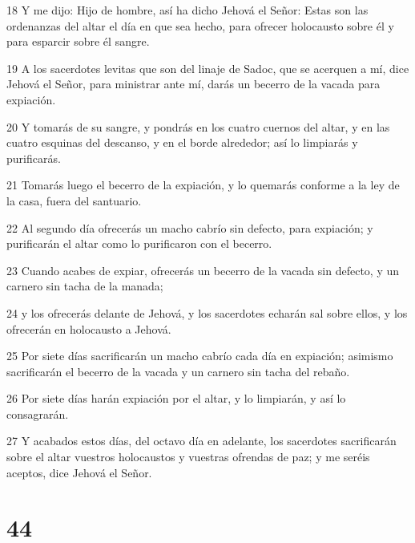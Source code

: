 \par 18 Y me dijo: Hijo de hombre, así ha dicho Jehová el Señor: Estas son las ordenanzas del altar el día en que sea hecho, para ofrecer holocausto sobre él y para esparcir sobre él sangre.
\par 19 A los sacerdotes levitas que son del linaje de Sadoc, que se acerquen a mí, dice Jehová el Señor, para ministrar ante mí, darás un becerro de la vacada para expiación.
\par 20 Y tomarás de su sangre, y pondrás en los cuatro cuernos del altar, y en las cuatro esquinas del descanso, y en el borde alrededor; así lo limpiarás y purificarás. 
\par 21 Tomarás luego el becerro de la expiación, y lo quemarás conforme a la ley de la casa, fuera del santuario.
\par 22 Al segundo día ofrecerás un macho cabrío sin defecto, para expiación; y purificarán el altar como lo purificaron con el becerro.
\par 23 Cuando acabes de expiar, ofrecerás un becerro de la vacada sin defecto, y un carnero sin tacha de la manada;
\par 24 y los ofrecerás delante de Jehová, y los sacerdotes echarán sal sobre ellos, y los ofrecerán en holocausto a Jehová.
\par 25 Por siete días sacrificarán un macho cabrío cada día en expiación; asimismo sacrificarán el becerro de la vacada y un carnero sin tacha del rebaño.
\par 26 Por siete días harán expiación por el altar, y lo limpiarán, y así lo consagrarán.
\par 27 Y acabados estos días, del octavo día en adelante, los sacerdotes sacrificarán sobre el altar vuestros holocaustos y vuestras ofrendas de paz; y me seréis aceptos, dice Jehová el Señor. 

\chapter{44}

